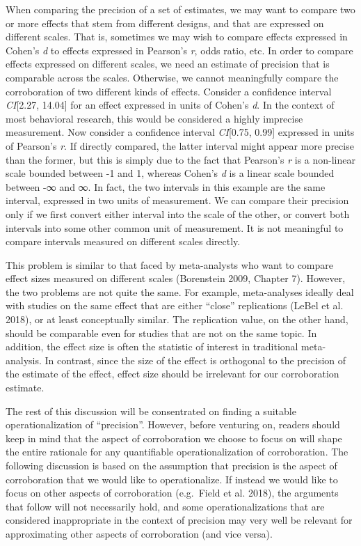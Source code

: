 \documentclass[]{article}
\begin{document}
When comparing the precision of a set of estimates, we may want to
compare two or more effects that stem from different designs, and that
are expressed on different scales. That is, sometimes we may wish to
compare effects expressed in Cohen's \emph{d} to effects expressed in
Pearson's \emph{r}, odds ratio, etc. In order to compare effects
expressed on different scales, we need an estimate of precision that is
comparable across the scales. Otherwise, we cannot meaningfully compare
the corroboration of two different kinds of effects. Consider a
confidence interval \emph{CI}{[}2.27, 14.04{]} for an effect expressed
in units of Cohen's \emph{d}. In the context of most behavioral
research, this would be considered a highly imprecise measurement. Now
consider a confidence interval \emph{CI}{[}0.75, 0.99{]} expressed in
units of Pearson's \emph{r}. If directly compared, the latter interval
might appear more precise than the former, but this is simply due to the
fact that Pearson's \emph{r} is a non-linear scale bounded between -1
and 1, whereas Cohen's \emph{d} is a linear scale bounded between -∞ and
∞. In fact, the two intervals in this example are the same interval,
expressed in two units of measurement. We can compare their precision
only if we first convert either interval into the scale of the other, or
convert both intervals into some other common unit of measurement. It is
not meaningful to compare intervals measured on different scales
directly.

This problem is similar to that faced by meta-analysts who want to
compare effect sizes measured on different scales (Borenstein 2009,
Chapter 7). However, the two problems are not quite the same. For
example, meta-analyses ideally deal with studies on the same effect that
are either ``close'' replications (LeBel et al. 2018), or at least
conceptually similar. The replication value, on the other hand, should
be comparable even for studies that are not on the same topic. In
addition, the effect size is often the statistic of interest in
traditional meta-analysis. In contrast, since the size of the effect is
orthogonal to the precision of the estimate of the effect, effect size
should be irrelevant for our corroboration estimate.

The rest of this discussion will be consentrated on finding a suitable
operationalization of ``precision''. However, before venturing on,
readers should keep in mind that the aspect of corroboration we choose
to focus on will shape the entire rationale for any quantifiable
operationalization of corroboration. The following discussion is based
on the assumption that precision is the aspect of corroboration that we
would like to operationalize. If instead we would like to focus on other
aspects of corroboration (e.g.~Field et al. 2018), the arguments that
follow will not necessarily hold, and some operationalizations that are
considered inappropriate in the context of precision may very well be
relevant for approximating other aspects of corroboration (and vice
versa).
\end{document}

